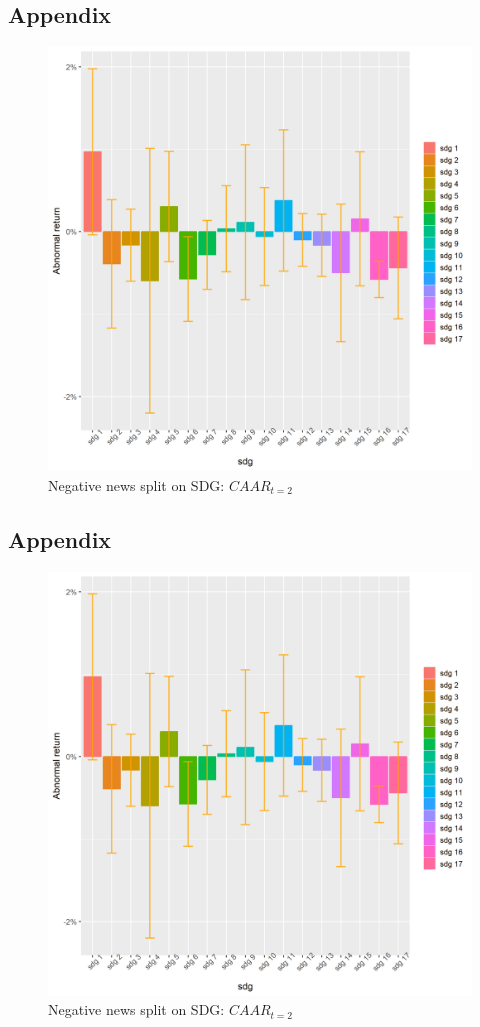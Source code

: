 \subsection{Appendix} \label{app: derivations}
\begin{figure} [H] 
    \centering
    \includegraphics[scale=0.6]{Projekt/1.Figures analysis/ST_negative_sdg_bar_2.png} 
    \caption{Negative news split on SDG: $CAAR_{t=2}$}
    \label{fig:ST_pos_news}
\end{figure}

\subsection{Appendix} \label{app: derivations}
\begin{figure} [H] 
    \centering
    \includegraphics[scale=0.6]{Projekt/1.Figures analysis/ST_negative_sdg_bar_2.png} 
    \caption{Negative news split on SDG: $CAAR_{t=2}$}
    \label{fig:ST_pos_news}
\end{figure}